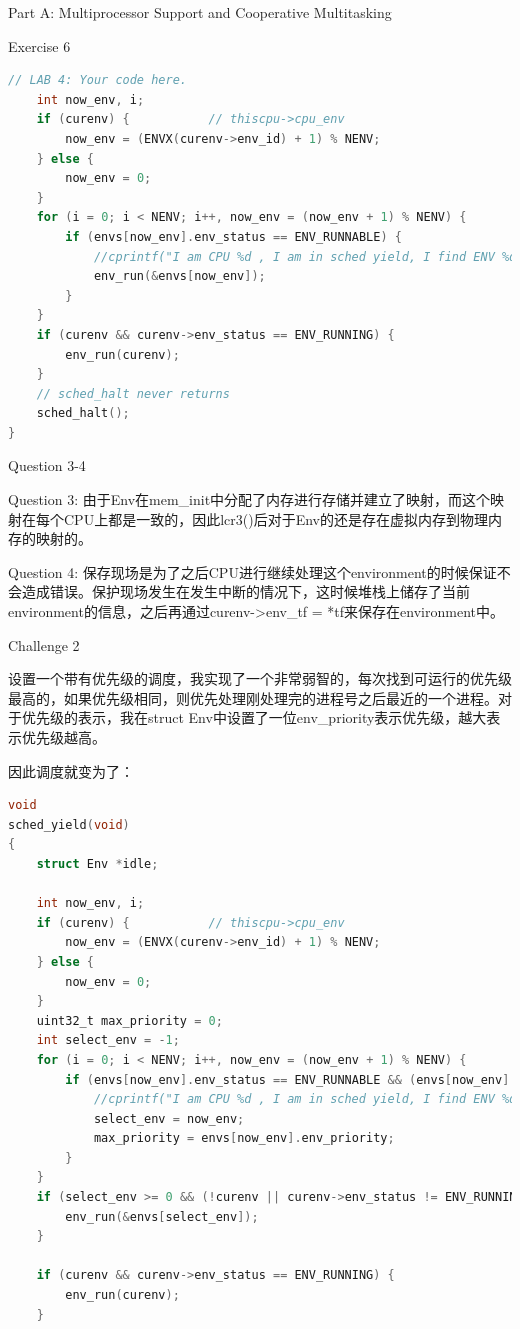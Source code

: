\documentclass[GBK,winfonts,a4paper,10pt]{ctexart}
\begin{document}
\begin{section}{Part A: Multiprocessor Support and Cooperative Multitasking}
\begin{subsection}{Exercise 6}
\begin{lstlisting}[language=C]
	// LAB 4: Your code here.
	int now_env, i;
	if (curenv) {			// thiscpu->cpu_env
		now_env = (ENVX(curenv->env_id) + 1) % NENV;
	} else {
		now_env = 0;
	}
	for (i = 0; i < NENV; i++, now_env = (now_env + 1) % NENV) {
		if (envs[now_env].env_status == ENV_RUNNABLE) {
			//cprintf("I am CPU %d , I am in sched yield, I find ENV %d\n", thiscpu->cpu_id, now_env);
			env_run(&envs[now_env]);
		}
	}
	if (curenv && curenv->env_status == ENV_RUNNING) {
		env_run(curenv);
	}
	// sched_halt never returns
	sched_halt();
}
\end{lstlisting}
\end{subsection}

\begin{subsection}{Question 3-4}
\par
Question 3: 由于Env在mem\_init中分配了内存进行存储并建立了映射，而这个映射在每个CPU上都是一致的，因此lcr3()后对于Env的还是存在虚拟内存到物理内存的映射的。
\par
Question 4: 保存现场是为了之后CPU进行继续处理这个environment的时候保证不会造成错误。保护现场发生在发生中断的情况下，这时候堆栈上储存了当前environment的信息，之后再通过curenv->env\_tf = *tf来保存在environment中。
\end{subsection}

\begin{subsection}{Challenge 2}
\par
设置一个带有优先级的调度，我实现了一个非常弱智的，每次找到可运行的优先级最高的，如果优先级相同，则优先处理刚处理完的进程号之后最近的一个进程。对于优先级的表示，我在struct Env中设置了一位env\_priority表示优先级，越大表示优先级越高。
\par
因此调度就变为了：
\begin{lstlisting}[language=C]
void
sched_yield(void)
{
	struct Env *idle;

	int now_env, i;
	if (curenv) {			// thiscpu->cpu_env
		now_env = (ENVX(curenv->env_id) + 1) % NENV;
	} else {
		now_env = 0;
	}
	uint32_t max_priority = 0;
	int select_env = -1;
	for (i = 0; i < NENV; i++, now_env = (now_env + 1) % NENV) {
		if (envs[now_env].env_status == ENV_RUNNABLE && (envs[now_env].env_priority > max_priority || select_env == -1)) {
			//cprintf("I am CPU %d , I am in sched yield, I find ENV %d\n", thiscpu->cpu_id, now_env);
			select_env = now_env;
			max_priority = envs[now_env].env_priority;
		}
	}
	if (select_env >= 0 && (!curenv || curenv->env_status != ENV_RUNNING || max_priority >= curenv->env_priority)) {
		env_run(&envs[select_env]);
	}
	
	if (curenv && curenv->env_status == ENV_RUNNING) {
		env_run(curenv);
	}


\end{lstlisting}
\end{subsection}
\end{section}
\end{document}
